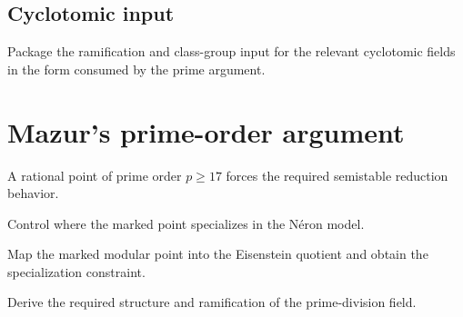 \section{Cyclotomic input}

\begin{theorem}\label{node:MT-CYCLOTOMIC-UNRAMIFIED}
Package the ramification and class-group input for the relevant cyclotomic
fields in the form consumed by the prime argument.
\leanpending
\end{theorem}

\chapter{Mazur's prime-order argument}

\begin{theorem}\label{node:MT-PRIME-SEMISTABLE}
A rational point of prime order \(p\geq 17\) forces the required semistable
reduction behavior.
\leanpending
\end{theorem}

\begin{theorem}\label{node:MT-PRIME-OUTSIDE-IDENTITY}
Control where the marked point specializes in the N\'eron model.
\leanpending
\end{theorem}

\begin{theorem}\label{node:MT-PRIME-EISENSTEIN-SPECIALIZATION}
Map the marked modular point into the Eisenstein quotient and obtain the
specialization constraint.
\leanpending
\end{theorem}

\begin{theorem}\label{node:MT-PRIME-DIVISION-FIELD}
Derive the required structure and ramification of the prime-division field.
\leanpending
\end{theorem}

